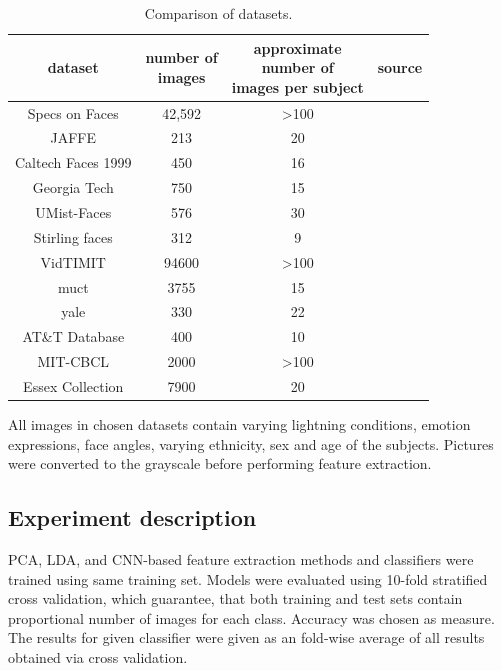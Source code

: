 \documentclass[a4paper, 10 pt, conference]{ieeeconf}
\begin{document}
\begin{table}[!h]
    \centering
    \caption{Comparison of datasets.}
    \begin{tabular}{|c|c|c|c|}
         \hline
         dataset & \thead{number of\\ images} & \thead{approximate\\ number of\\ images per subject} & source \\
         \hline
         Specs on Faces & 42,592 & >100 & \cite{afifi2017afif4} \\
         \hline
         JAFFE & 213 & 20 & \cite{JAFFE} \\
         \hline
         Caltech Faces 1999 & 450 & 16 & \cite{CaltechFaces} \\
         \hline
         Georgia Tech & 750 & 15 & \cite{georgia_tech_face_database} \\
         \hline
         UMist-Faces & 576 & 30 & \cite{UMist-Faces} \\
         \hline
         Stirling faces & 312 & 9 & \cite{Stirling_faces} \\
         \hline
         VidTIMIT & 94600 & >100 & \cite{VidTIMIT} \\
         \hline
         muct & 3755 & 15 & \cite{Milborrow10} \\
         \hline
         yale & 330 & 22 & \cite{yale} \\
         \hline
         AT\&T Database & 400 & 10 & \cite{TheDatabaseOfFaces} \\
         \hline
         MIT-CBCL  & 2000 & >100 & \cite{FaceRecognitionDatabase} \\
         \hline
         Essex Collection & 7900 & 20 & \cite{essex} \\
          \hline
    \end{tabular}
    \label{tab:datasets}
\end{table}

All images in chosen datasets contain varying lightning conditions, emotion expressions, face angles, varying ethnicity, sex and age of the subjects. Pictures were converted to the grayscale before performing feature extraction. 

\subsection{Experiment description}

PCA, LDA, and CNN-based feature extraction methods and classifiers were trained using same training set. Models were evaluated using 10-fold stratified cross validation, which guarantee, that both training and test sets contain proportional number of images for each class. Accuracy was chosen as measure. The results for given classifier were given as an fold-wise average of all results obtained via cross validation.
\end{document}
